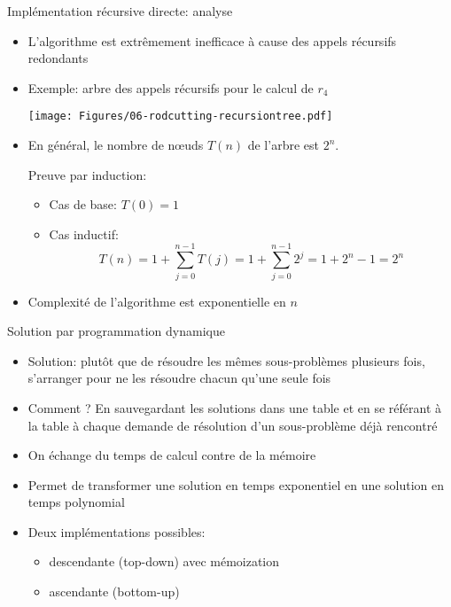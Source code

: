 \begin{frame}{Implémentation récursive directe: analyse}

\begin{itemize}
\item L'algorithme est extrêmement inefficace à cause des appels récursifs redondants
\item Exemple: arbre des appels récursifs pour le calcul de $r_4$

\centerline{\texttt{[image: Figures/06-rodcutting-recursiontree.pdf]}}

\item En général, le nombre de n\oe uds $T(n)$ de l'arbre est $2^n$.\\
{\small Preuve par induction:
\begin{itemize}
\item Cas de base: $T(0)=1$
\item Cas inductif: $$T(n)=1+\sum_{j=0}^{n-1} T(j)=1+\sum_{j=0}^{n-1} 2^j=1+2^n-1=2^n$$
\end{itemize}}
\item Complexité de l'algorithme est exponentielle en $n$
\end{itemize}
\end{frame}

\begin{frame}{Solution par programmation dynamique}

\begin{itemize}
\item Solution: plutôt que de résoudre les mêmes sous-problèmes plusieurs fois,
  s'arranger pour ne les résoudre chacun qu'une seule fois
\item Comment ? En sauvegardant les solutions dans une table et en se
  référant à la table à chaque demande de résolution d'un
  sous-problème déjà rencontré
\item On échange du temps de calcul contre de la mémoire
\item Permet de transformer une solution en temps exponentiel en une solution en temps polynomial
\item Deux implémentations possibles:
\begin{itemize}
\item descendante (top-down) avec \alert{mémoization}
\item ascendante (bottom-up)
\end{itemize}

\end{itemize}

\end{frame}

